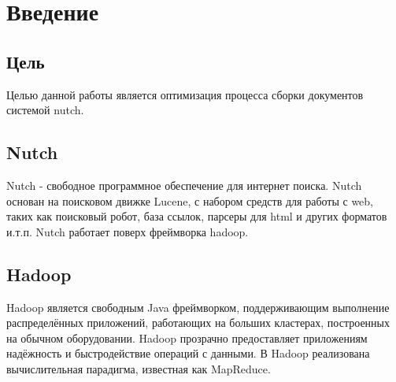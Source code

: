 \chapter{Введение}
\section*{Цель}
Целью данной работы является оптимизация процесса сборки документов системой nutch.
\section*{Nutch}
Nutch - свободное программное обеспечение для интернет поиска.
Nutch основан на поисковом движке Lucene\cite{lucene}, с набором средств для работы с web, таких как поисковый робот, база ссылок, парсеры для html и других форматов и.т.п.
Nutch работает поверх фреймворка hadoop.
\section*{Hadoop}
\label{sec:hadoop}
Hadoop является свободным Java фреймворком, поддерживающим выполнение распределённых приложений, работающих на больших кластерах, построенных на обычном оборудовании. Hadoop прозрачно предоставляет приложениям надёжность и быстродействие операций с данными. В Hadoop реализована вычислительная парадигма, известная как MapReduce.
